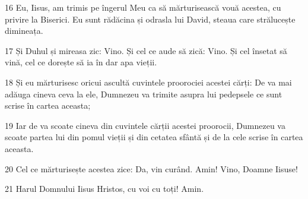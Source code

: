 \par 16 Eu, Iisus, am trimis pe îngerul Meu ca să mărturisească vouă acestea, cu privire la Biserici. Eu sunt rădăcina și odrasla lui David, steaua care strălucește dimineața.
\par 17 Și Duhul și mireasa zic: Vino. Și cel ce aude să zică: Vino. Și cel însetat să vină, cel ce dorește să ia în dar apa vieții.
\par 18 Și eu mărturisesc oricui ascultă cuvintele proorociei acestei cărți: De va mai adăuga cineva ceva la ele, Dumnezeu va trimite asupra lui pedepsele ce sunt scrise în cartea aceasta;
\par 19 Iar de va scoate cineva din cuvintele cărții acestei proorocii, Dumnezeu va scoate partea lui din pomul vieții și din cetatea sfântă și de la cele scrise în cartea aceasta.
\par 20 Cel ce mărturisește acestea zice: Da, vin curând. Amin! Vino, Doamne Iisuse!
\par 21 Harul Domnului Iisus Hristos, cu voi cu toți! Amin.


